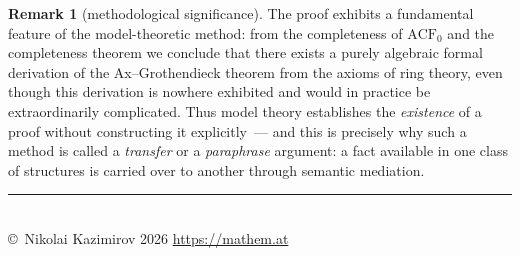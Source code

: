 \documentclass[12pt, a4paper]{article}
\theoremstyle{plain}
\theoremstyle{definition}
\newtheorem{remark}[theorem]{Remark}
\begin{document}
\begin{remark}[methodological significance]
The proof exhibits a fundamental feature of the model-theoretic method:
from the completeness of $\mathrm{ACF}_0$ and the completeness theorem we conclude that
there exists a purely algebraic formal derivation of the Ax--Grothendieck theorem
from the axioms of ring theory, even though this derivation is nowhere
exhibited and would in practice be
extraordinarily complicated. Thus model theory establishes the \emph{existence}
of a proof without constructing it explicitly~--- and this is precisely why such
a method is called a \emph{transfer} or a \emph{paraphrase} argument: a fact available in one
class of structures is carried over to another through semantic
mediation.
\end{remark}

\vfill
\begin{center}
\rule{0.3\textwidth}{0.4pt}\\[0.5em]
{\footnotesize\color{gray} \copyright\ Nikolai Kazimirov 2026 \quad\textbar\quad \url{https://mathem.at}}
\end{center}
\end{document}
